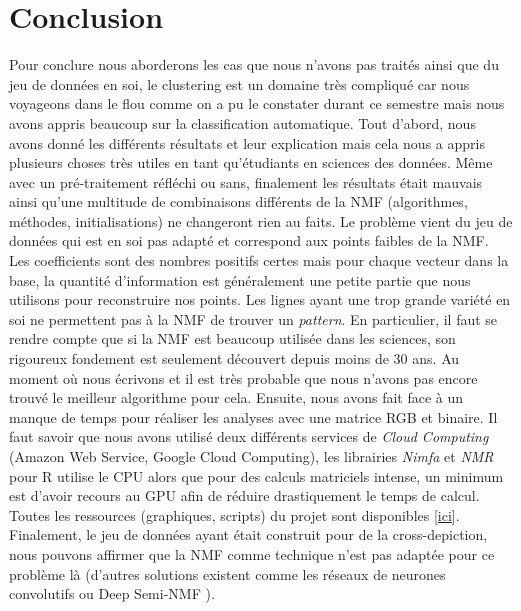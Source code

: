 \documentclass[runningheads]{llncs}
\begin{document}
\section{Conclusion}
\label{conclusion}
Pour conclure nous aborderons les cas que nous n'avons pas traités ainsi que du jeu de données en soi, le clustering est un domaine très compliqué car nous voyageons dans le flou comme on a pu le constater durant ce semestre mais nous avons appris beaucoup sur la classification automatique.
Tout d'abord, nous avons donné les différents résultats et leur explication mais cela nous a appris plusieurs choses très utiles en tant qu'étudiants en sciences des données. Même avec un pré-traitement réfléchi ou sans, finalement les résultats était mauvais ainsi qu'une multitude de combinaisons différents de la NMF (algorithmes, méthodes, initialisations) ne changeront rien au faits. Le problème vient du jeu de données qui est en soi pas adapté et correspond aux points faibles de la NMF. Les coefficients sont des nombres positifs certes mais pour chaque vecteur dans la base, la quantité d'information est généralement une petite partie que nous utilisons pour reconstruire nos points. Les lignes ayant une trop grande variété en soi ne permettent pas à la NMF de trouver un \textit{pattern}.
En particulier, il faut se rendre compte que si la NMF est beaucoup utilisée dans les sciences, son rigoureux fondement est seulement découvert depuis moins de 30 ans. Au moment où nous écrivons et il est très probable que nous n'avons pas encore trouvé le meilleur algorithme pour cela.
Ensuite, nous avons fait face à un manque de temps pour réaliser les analyses avec une matrice RGB et binaire. Il faut savoir que nous avons utilisé deux différents services de \textit{Cloud Computing} (Amazon Web Service, Google Cloud Computing), les librairies \textit{Nimfa} et \textit{NMR} pour R utilise le CPU alors que pour des calculs matriciels intense, un minimum est d'avoir recours au GPU afin de réduire drastiquement le temps de calcul. Toutes les ressources (graphiques, scripts) du projet sont disponibles [\href{https://github.com/mbenhamd/nmf-ter}{ici}].
Finalement, le jeu de données ayant était construit pour de la cross-depiction, nous pouvons affirmer que la NMF comme technique n'est pas adaptée pour ce problème là (d'autres solutions existent comme les réseaux de neurones convolutifs \cite{final} ou Deep Semi-NMF \cite{deepnmf}).

%
%
%
% 
% 
%

 

\end{document}
